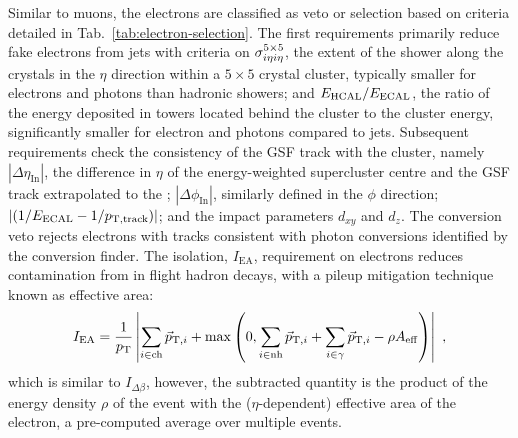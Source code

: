 Similar to muons, the electrons are classified as veto or selection based on
criteria detailed in Tab.~\ref{tab:electron-selection}. The first requirements
primarily reduce fake electrons from jets with criteria on $\sigma_{i\eta i\eta}^{5\times 5}$, the
extent of the shower along the \ECAL crystals in the $\eta$ direction within a
$5\times 5$ crystal cluster, typically smaller for electrons and photons than
hadronic showers; and $E_{\mathrm{HCAL}}/E_{\mathrm{ECAL}}$, the ratio
of the energy deposited in \HCAL towers located behind the \ECAL cluster to
the \ECAL cluster energy, significantly smaller for electron and photons
compared to jets. Subsequent requirements check the consistency of the GSF
track with the \ECAL cluster, namely $|\Delta\eta_{\mathrm{In}}|$, the
difference in $\eta$ of the energy-weighted supercluster centre and the GSF
track extrapolated to the \ECAL; $|\Delta\phi_{\mathrm{In}}|$, similarly
defined in the $\phi$ direction; $|(1/E_{\mathrm{ECAL}} -
1/p_{\mathrm{T,track}})|$; and the impact parameters $d_{xy}$ and $d_{z}$. The
conversion veto rejects electrons with tracks consistent with photon
conversions identified by the conversion finder. The isolation,
$I_{\mathrm{EA}}$, requirement on electrons reduces contamination from in
flight hadron decays, with a pileup mitigation technique known as effective
area:
%
\begin{equation}
    I_{\mathrm{EA}} = \frac{1}{p_{\text{T}}} \left| \sum_{i\in\mathrm{ch}} \vec{p}_{\mathrm{T},i} + \max\left(0, \sum_{i\in\mathrm{nh}}\vec{p}_{\mathrm{T},i} + \sum_{i\in\gamma}\vec{p}_{\mathrm{T},i} - \rho A_{\mathrm{eff}}\right) \right|\ ,
\end{equation}
%
which is similar to $I_{\Delta\beta}$, however, the subtracted quantity is the
product of the energy density $\rho$ of the event with the ($\eta$-dependent)
effective area of the electron, a pre-computed average over multiple events.

